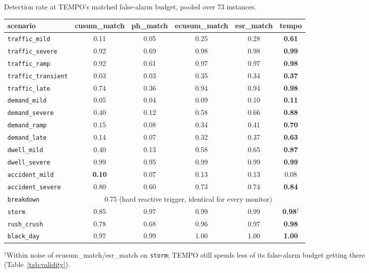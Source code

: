 \documentclass[trsc,dblanonrev]{informs4}
\begin{document}
\begin{table}
\TABLE
{Detection rate at TEMPO's matched false-alarm budget, pooled over 73
instances.\label{tab:detection}}
{\footnotesize\begin{tabular}{@{}lccccc@{}}
\toprule
scenario & cusum\_match & ph\_match & ecusum\_match & esr\_match &
\textbf{tempo} \\
\midrule
\texttt{traffic\_mild}      & 0.11 & 0.05 & 0.25 & 0.28 & \textbf{0.61} \\
\texttt{traffic\_severe}    & 0.92 & 0.69 & 0.98 & 0.98 & \textbf{0.99} \\
\texttt{traffic\_ramp}      & 0.92 & 0.61 & 0.97 & 0.97 & \textbf{0.98} \\
\texttt{traffic\_transient} & 0.03 & 0.03 & 0.35 & 0.34 & \textbf{0.37} \\
\texttt{traffic\_late}      & 0.74 & 0.36 & 0.94 & 0.94 & \textbf{0.98} \\
\texttt{demand\_mild}       & 0.05 & 0.04 & 0.09 & 0.10 & \textbf{0.11} \\
\texttt{demand\_severe}     & 0.40 & 0.12 & 0.58 & 0.66 & \textbf{0.88} \\
\texttt{demand\_ramp}       & 0.15 & 0.08 & 0.34 & 0.41 & \textbf{0.70} \\
\texttt{demand\_late}       & 0.14 & 0.07 & 0.32 & 0.37 & \textbf{0.63} \\
\texttt{dwell\_mild}        & 0.40 & 0.13 & 0.58 & 0.65 & \textbf{0.87} \\
\texttt{dwell\_severe}      & 0.99 & 0.95 & 0.99 & 0.99 & \textbf{0.99} \\
\texttt{accident\_mild}     & \textbf{0.10} & 0.07 & 0.13 & 0.13 & 0.08 \\
\texttt{accident\_severe}   & 0.80 & 0.60 & 0.73 & 0.74 & \textbf{0.84} \\
\texttt{breakdown}          & \multicolumn{5}{c}{0.75 (hard reactive trigger, identical for every monitor)} \\
\texttt{storm}              & 0.85 & 0.97 & 0.99 & 0.99 & \textbf{0.98$^\dagger$} \\
\texttt{rush\_crush}        & 0.78 & 0.68 & 0.96 & 0.97 & \textbf{0.98} \\
\texttt{black\_day}         & 0.97 & 0.99 & 1.00 & 1.00 & \textbf{1.00} \\
\bottomrule
\end{tabular}}
{$^\dagger$Within noise of ecusum\_match/esr\_match on \texttt{storm};
TEMPO still spends less of its false-alarm budget getting there
(Table~\ref{tab:validity}).}
\end{table}
\end{document}
